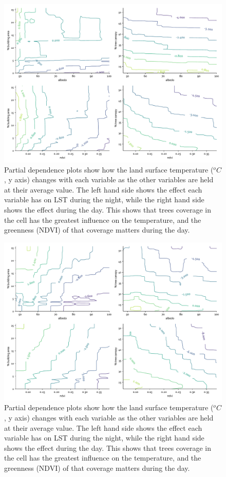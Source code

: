 \documentclass[final,3p,times,twocolumn,sort&compress]{elsarticle}
\begin{document}
\begin{figure}
    \centering
    \includegraphics[width=\linewidth]{fig/report/pdp_2d_night_500.pdf}
    \caption{
    Partial dependence plots show how the land surface temperature ($^oC$, y axis) changes with each variable as the other variables are held at their average value. The left hand side shows the effect each variable has on LST during the night, while the right hand side shows the effect during the day. This shows that trees coverage in the cell has the greatest influence on the temperature, and the greenness (NDVI) of that coverage matters during the day.
    }
    \label{fig:pdp_2dnight}
\end{figure}

\begin{figure}
    \centering
    \includegraphics[width=\linewidth]{fig/report/pdp_2d_day_500.pdf}
    \caption{
    Partial dependence plots show how the land surface temperature ($^oC$, y axis) changes with each variable as the other variables are held at their average value. The left hand side shows the effect each variable has on LST during the night, while the right hand side shows the effect during the day. This shows that trees coverage in the cell has the greatest influence on the temperature, and the greenness (NDVI) of that coverage matters during the day.
    }
    \label{fig:pdp_2dday}
\end{figure}
\end{document}
